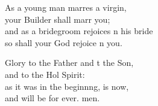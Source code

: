 \begin{psalmverse}
\begin{patverse}
As a young man marr\pointup{\i}es a virgin,\Med\\
your Builder shall marr you;\\
and as a bridegroom rejoices \pointup{\i}n his bride\Med\\
so shall your God rejoice \pointup{\i}n you.

Glory to the Father and t the Son,\Med\\
    and to the Hol Spirit:\\
as it was in the beginn\pointup{\i}ng, is now,\Med\\
    and will be for ever. men.
  \end{patverse}
\end{psalmverse}
